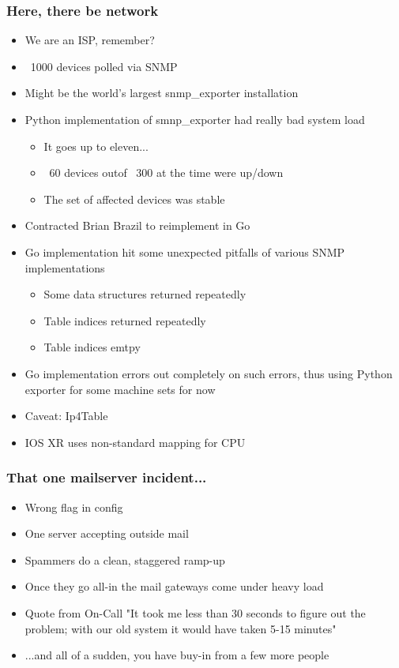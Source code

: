 \documentclass[t]{beamer}
\begin{document}
\begin{frame}
	\frametitle{Here, there be network}
	\begin{itemize}
		\item We are an ISP, remember?
		\item ~1000 devices polled via SNMP
		\item Might be the world's largest snmp\_exporter installation
		\item Python implementation of smnp\_exporter had really bad system load
		\begin{itemize}
			\item It goes up to eleven...
			\item ~60 devices outof ~300 at the time were up/down
			\item The set of affected devices was stable
		\end{itemize}
		\item Contracted Brian Brazil to reimplement in Go
		\item Go implementation hit some unexpected pitfalls of various SNMP implementations
		\begin{itemize}
			\item Some data structures returned repeatedly
			\item Table indices returned repeatedly
			\item Table indices emtpy
		\end{itemize}
		\item Go implementation errors out completely on such errors, thus using Python exporter for some machine sets for now
		\item Caveat: Ip4Table %
		\item IOS XR uses non-standard mapping for CPU %
	\end{itemize}
\end{frame}


\begin{frame}
	\frametitle{That one mailserver incident...}
	\begin{itemize}
		\item Wrong flag in config
		\item One server accepting outside mail
		\item Spammers do a clean, staggered ramp-up
		\item Once they go all-in the mail gateways come under heavy load
		\item Quote from On-Call "It took me less than 30 seconds to figure out the problem; with our old system it would have taken 5-15 minutes"
		\item ...and all of a sudden, you have buy-in from a few more people
	\end{itemize}
\end{frame}
\end{document}
